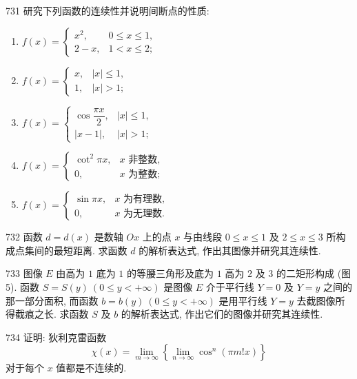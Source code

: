 \begin{prob}[L]{731}
研究下列函数的连续性并说明间断点的性质:
\begin{enumerate}[label=(\alph*), itemsep=2pt, topsep=3pt]
\item $f(x) = \begin{cases} x^2, & 0 \leqslant x \leqslant 1, \\ 2 - x, & 1 < x \leqslant 2; \end{cases}$
\item $f(x) = \begin{cases} x, & |x| \leqslant 1, \\ 1, & |x| > 1; \end{cases}$
\item $f(x) = \begin{cases} \cos\dfrac{\pi x}{2}, & |x| \leqslant 1, \\ |x - 1|, & |x| > 1; \end{cases}$
\item $f(x) = \begin{cases} \cot^2 \pi x, & x \text{ 非整数}, \\ 0, & x \text{ 为整数}; \end{cases}$
\item $f(x) = \begin{cases} \sin \pi x, & x \text{ 为有理数}, \\ 0, & x \text{ 为无理数}. \end{cases}$
\end{enumerate}
\end{prob}

\begin{prob}[M]{732}
函数 $d = d(x)$ 是数轴 $Ox$ 上的点 $x$ 与由线段 $0 \leqslant x \leqslant 1$ 及 $2 \leqslant x \leqslant 3$ 所构成点集间的最短距离. 求函数 $d$ 的解析表达式, 作出其图像并研究其连续性.
\end{prob}

\begin{prob}[L]{733}
图像 $E$ 由高为 $1$ 底为 $1$ 的等腰三角形及底为 $1$ 高为 $2$ 及 $3$ 的二矩形构成 (图 5). 函数 $S = S(y) \ (0 \leqslant y < +\infty)$ 是图像 $E$ 介于平行线 $Y = 0$ 及 $Y = y$ 之间的那一部分面积, 而函数 $b = b(y) \ (0 \leqslant y < +\infty)$ 是用平行线 $Y = y$ 去截图像所得截痕之长. 求函数 $S$ 及 $b$ 的解析表达式, 作出它们的图像并研究其连续性.
\end{prob}

\begin{prob}[M]{734}
证明: 狄利克雷函数
\[
\chi(x) = \lim_{m \to \infty} \left\{\lim_{n \to \infty} \cos^n(\pi m! x)\right\}
\]
对于每个 $x$ 值都是不连续的.
\end{prob}

